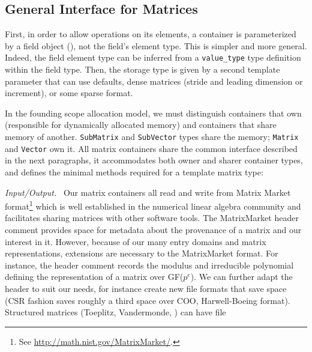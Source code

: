 \subsection{General Interface for %
Matrices}
%
First, in order to allow operations on its elements, a container is
parameterized by a field object (), not the field's element
type. This is simpler and more general.
Indeed, the field element type can be inferred from a
\verb!value_type! type definition within the field type.
Then, the storage type is given by a second
template parameter that can use defaults,
\eg dense \blas matrices (stride
and leading dimension or increment), or some sparse format.
%

%
In the founding scope allocation model, we must distinguish containers that own (responsible for
dynamically allocated memory) and containers that share memory of another.
\texttt{SubMatrix} and \texttt{SubVector} types share the memory;
\texttt{Matrix} and \texttt{Vector} own it.
%
All matrix containers share the common \applin  interface
described in the next paragraphs, it accommodates both owner and sharer
container types, and defines the minimal methods required for a
template \applin matrix type:
%
% 
%
%
\def\monitem#1{\par\textit{#1}\ }
\monitem{Input/Output.}
		Our matrix containers all read and write from Matrix Market
		format\footnote{See \url{http://math.nist.gov/MatrixMarket/}.}
		which is well established in the numerical linear algebra
		community and facilitates sharing matrices with other software
		tools.  The MatrixMarket header comment provides space for
		metadata about the provenance of a matrix and our interest in
		it.  However, because of our many entry domains and matrix
		representations, extensions are necessary to the MatrixMarket
		format.  For instance, the header comment records the modulus
		and irreducible polynomial defining the representation of a
		matrix over GF($p^e$).
		We can further adapt the header to suit our needs, for instance
		create new file formats that save space (\eg CSR fashion saves
		roughly a third space over COO, \cf Harwell-Boeing format).
		Structured matrices (Toeplitz, Vandermonde, \etc) can have file

